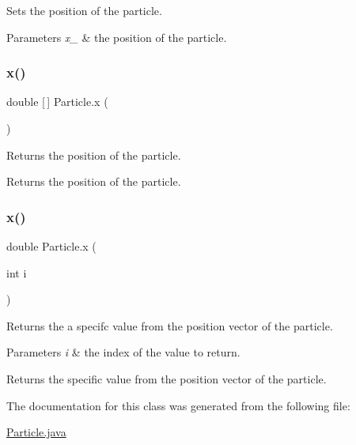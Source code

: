 Sets the position of the particle. 
\begin{DoxyParams}{Parameters}
{\em x\+\_\+} & the position of the particle. \\
\hline
\end{DoxyParams}
\mbox{\label{class_particle_a4ae274d487a3565fa11d59206c45139d}} 
\subsubsection{\texorpdfstring{x()}{x()}\hspace{0.1cm}{\footnotesize\ttfamily [2/3]}}
{\footnotesize\ttfamily double \mbox{[}$\,$\mbox{]} Particle.\+x (\begin{DoxyParamCaption}{ }\end{DoxyParamCaption})}

Returns the position of the particle. \begin{DoxyReturn}{Returns}
the position of the particle. 
\end{DoxyReturn}
\mbox{\label{class_particle_a1298e71228d20427caf49481cd1d0fdf}} 
\subsubsection{\texorpdfstring{x()}{x()}\hspace{0.1cm}{\footnotesize\ttfamily [3/3]}}
{\footnotesize\ttfamily double Particle.\+x (\begin{DoxyParamCaption}\item[{int}]{i }\end{DoxyParamCaption})}

Returns the a specifc value from the position vector of the particle. 
\begin{DoxyParams}{Parameters}
{\em i} & the index of the value to return. \\
\hline
\end{DoxyParams}
\begin{DoxyReturn}{Returns}
the specific value from the position vector of the particle. 
\end{DoxyReturn}


The documentation for this class was generated from the following file\+:\begin{DoxyCompactItemize}
\item 
\hyperlink{_particle_8java}{Particle.\+java}\end{DoxyCompactItemize}
